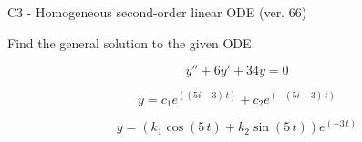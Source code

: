 \begin{exercise}
  \begin{exerciseTitle}C3 - Homogeneous second-order linear ODE (ver. 66)\end{exerciseTitle}
  \begin{exerciseStatement}
    
Find the general solution to the given ODE.

    
\[y''+6y'+34y = 0\]

  \end{exerciseStatement}
  \begin{exerciseAnswer}
    
\[y= c_{1} e^{\left(\left(5 i - 3\right) \, t\right)} + c_{2} e^{\left(-\left(5 i + 3\right) \, t\right)}\]

    
\[y= {\left(k_{1} \cos\left(5 \, t\right) + k_{2} \sin\left(5 \, t\right)\right)} e^{\left(-3 \, t\right)}\]

  \end{exerciseAnswer}
\end{exercise}